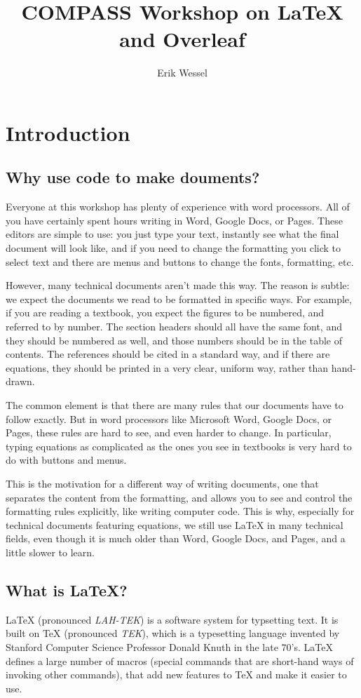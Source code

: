 \documentclass{article}
\title{COMPASS Workshop on \LaTeX{} and Overleaf}
\author{Erik Wessel}
\begin{document}
\maketitle

\section{Introduction}
\subsection{Why use code to make douments?}
Everyone at this workshop has plenty of experience with word processors.
All of you have certainly spent hours writing in Word, Google Docs, or Pages. These editors are simple to use: you just type your text, instantly see what the final document will look like, and if you need to change the formatting you click to select text and there are menus and buttons to change the fonts, formatting, etc.

However, many technical documents aren't made this way. The reason is subtle: we expect the documents we read to be formatted in specific ways. For example, if you are reading a textbook, you expect the figures to be numbered, and referred to by number. The section headers should all have the same font, and they should be numbered as well, and those numbers should be in the table of contents. The references should be cited in a standard way, and if there are equations, they should be printed in a very clear, uniform way, rather than hand-drawn.

The common element is that there are many rules that our documents have to follow exactly. But in word processors like Microsoft Word, Google Docs, or Pages, these rules are hard to see, and even harder to change. In particular, typing equations as complicated as the ones you see in textbooks is very hard to do with buttons and menus.

This is the motivation for a different way of writing documents, one that separates the content from the formatting, and allows you to see and control the formatting rules explicitly, like writing computer code. This is why, especially for technical documents featuring equations, we still use \LaTeX{} in many technical fields, even though it is much older than Word, Google Docs, and Pages, and a little slower to learn.

\subsection{What is \LaTeX{}?}
\LaTeX{} (pronounced \textit{LAH-TEK}) is a software system for typsetting text. It is built on \TeX{} (pronounced \textit{TEK}), which is a typesetting language invented by Stanford Computer Science Professor Donald Knuth in the late 70's. \LaTeX{} defines a large number of macros (special commands that are short-hand ways of invoking other commands), that add new features to \TeX{} and make it easier to use.
\end{document}
